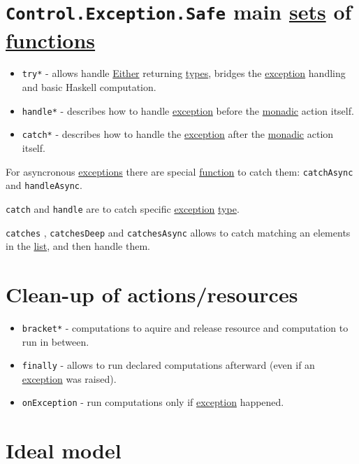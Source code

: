 \documentclass[a4paper,14pt,oneside]{book}
\begin{document}
\section{\texttt{Control.Exception.Safe} main \hyperref[org25dd845]{sets} of \hyperref[org196c7cc]{functions}}
\label{sec:org5ddeb65}

\begin{itemize}
\item \texttt{try*} - allows handle \hyperref[org2270ae2]{Either} returning \hyperref[org90f7adb]{types}, bridges the \hyperref[orga34d850]{exception} handling and basic Haskell computation.
\item \texttt{handle*} - describes how to handle \hyperref[orga34d850]{exception} before the \hyperref[orga2032e6]{monadic} action itself.
\item \texttt{catch*} - describes how to handle the \hyperref[orga34d850]{exception} after the \hyperref[orga2032e6]{monadic} action itself.
\end{itemize}

For asyncronous \hyperref[org92013ae]{exceptions} there are special \hyperref[org1a6611b]{function} to catch them: \texttt{catchAsync} and \texttt{handleAsync}.

\texttt{catch} and \texttt{handle} are to catch specific \hyperref[orga34d850]{exception} \hyperref[org99e5c3b]{type}.

\texttt{catches} , \texttt{catchesDeep} and \texttt{catchesAsync} allows to catch matching an elements in the \hyperref[orgdea574f]{list}, and then handle them.

\section{Clean-up of actions/resources}
\label{sec:orgca38c9f}

\begin{itemize}
\item \texttt{bracket*} - computations to aquire and release resource and computation to run in between.
\item \texttt{finally} - allows to run declared computations afterward (even if an \hyperref[orga34d850]{exception} was raised).
\item \texttt{onException} - run computations only if \hyperref[orga34d850]{exception} happened.
\end{itemize}

\section{Ideal model}
\label{sec:org15b80e5}
\end{document}
